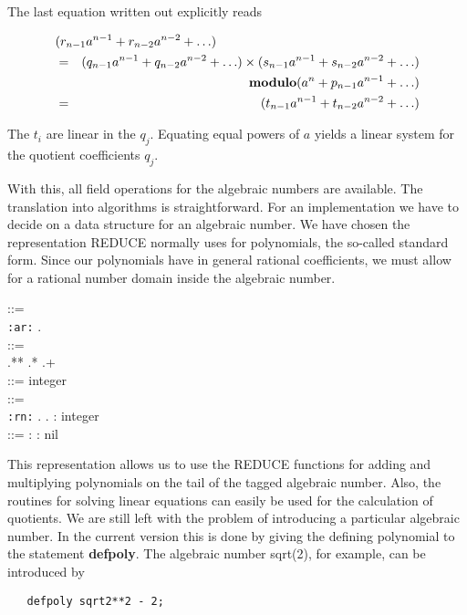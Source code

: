 The last equation written out explicitly reads

\begin{eqnarray*}
\lefteqn{({r_{n-1}} {a^{n-1}} + {r_{n-2}} {a^{n-2}} + \ldots)} \\
& = & ({q_{n-1}} {a^{n-1}} + {q_{n-2}} {a^{n-2}} + \ldots) \times
({s_{n-1}} {a^{n-1}} + {s_{n-2}} {a^{n-2}} + \ldots) \\
& & {\bf modulo} (a^n + {p _{n-1}} {a^{n -1}} + \ldots) \\
& = & ({t_{n-1}} {a^{n-1}} + {t_{n-2}} {a^{n-2}} + \ldots)
\end{eqnarray*}

The $t_i$ are linear in the $q_j$.  Equating equal powers of $a$ yields a
linear system for the quotient coefficients $q_j$.

With this, all field operations for the algebraic numbers are available.  The
translation into algorithms is straightforward.  For an implementation we
have to decide on a data structure for an algebraic number.  We have chosen
the representation REDUCE normally uses for polynomials, the so-called
standard form.  Since our polynomials have in general rational coefficients,
we must allow for a rational number domain inside the algebraic number.

\begin{tabbing}
 ::= \\
\hspace{.25in} \= {\tt :ar:} . 
\\[0.05in]

 ::= \\
\>  .**  .*  .+  \\[0.05in]

 ::= integer \\[0.3in]

 ::= \\
\> {\tt :rn:} .  .  :
integer \\[0.05in]

 ::=  :  : nil
\end{tabbing}

This representation allows us to use the REDUCE functions for adding and
multiplying polynomials on the tail of the tagged algebraic number.  Also,
the routines for solving linear equations can easily be used for the
calculation of quotients.  We are still left with the problem of
introducing a particular algebraic number.  In the current version this is
done by giving the defining polynomial to the statement {\bf defpoly}.  The
algebraic number sqrt(2), for example, can be introduced by
\begin{verbatim}
   defpoly sqrt2**2 - 2;
\end{verbatim}

